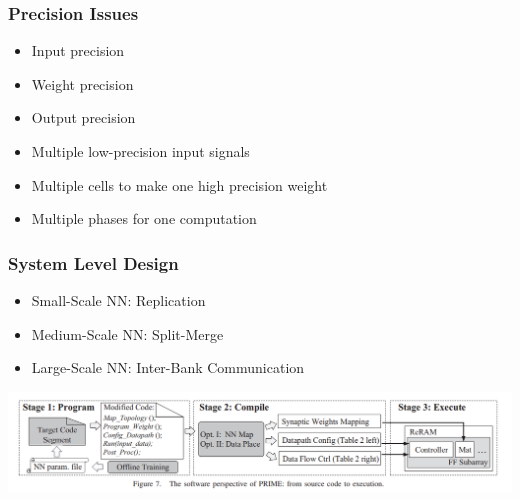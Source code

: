 \documentclass[hyperref={colorlinks}]{beamer}
\begin{document}
\begin{frame}
	\frametitle{Precision Issues}
	\begin{itemize}
		\item Input precision
		\item Weight precision
		\item Output precision
	\end{itemize}
	\begin{itemize}
		\item Multiple low-precision input signals
		\item Multiple cells to make one high precision weight
		\item Multiple phases for one computation
	\end{itemize}
\end{frame}

\begin{frame}
	\frametitle{System Level Design}
	\begin{itemize}
		\item Small-Scale NN: Replication
		\item Medium-Scale NN: Split-Merge
		\item Large-Scale NN: Inter-Bank Communication
	\end{itemize}
	\includegraphics[scale=0.25]{system_level.png}	
\end{frame}
\end{document}
